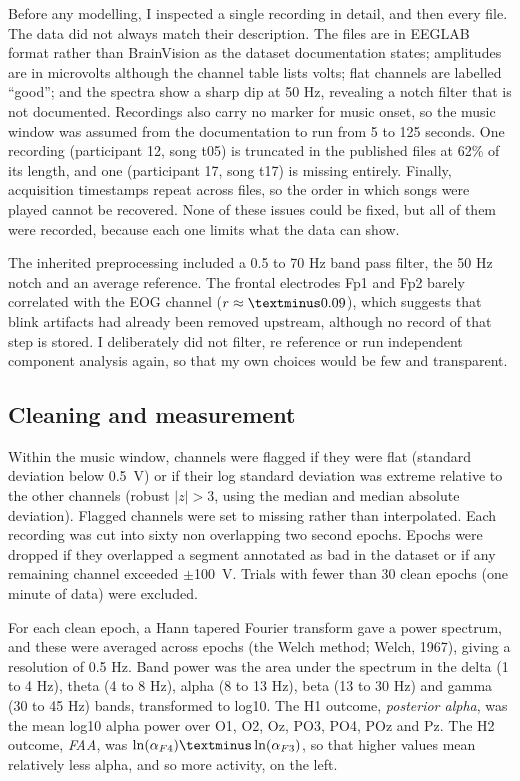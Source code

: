 \documentclass[11pt,a4paper]{article}
\newcommand{\m}{\textminus}
\newcommand{\uV}{\textmu V}
\begin{document}
Before any modelling, I inspected a single recording in detail, and then every file. The data did not always match their description. The files are in EEGLAB format rather than BrainVision as the dataset documentation states; amplitudes are in microvolts although the channel table lists volts; flat channels are labelled ``good''; and the spectra show a sharp dip at 50 Hz, revealing a notch filter that is not documented. Recordings also carry no marker for music onset, so the music window was assumed from the documentation to run from 5 to 125 seconds. One recording (participant 12, song t05) is truncated in the published files at 62\% of its length, and one (participant 17, song t17) is missing entirely. Finally, acquisition timestamps repeat across files, so the order in which songs were played cannot be recovered. None of these issues could be fixed, but all of them were recorded, because each one limits what the data can show.

The inherited preprocessing included a 0.5 to 70 Hz band pass filter, the 50 Hz notch and an average reference. The frontal electrodes Fp1 and Fp2 barely correlated with the EOG channel ($r \approx \m0.09$), which suggests that blink artifacts had already been removed upstream, although no record of that step is stored. I deliberately did not filter, re reference or run independent component analysis again, so that my own choices would be few and transparent.

\subsection{Cleaning and measurement}

Within the music window, channels were flagged if they were flat (standard deviation below 0.5~\uV) or if their log standard deviation was extreme relative to the other channels (robust $|z| > 3$, using the median and median absolute deviation). Flagged channels were set to missing rather than interpolated. Each recording was cut into sixty non overlapping two second epochs. Epochs were dropped if they overlapped a segment annotated as bad in the dataset or if any remaining channel exceeded $\pm$100~\uV. Trials with fewer than 30 clean epochs (one minute of data) were excluded.

For each clean epoch, a Hann tapered Fourier transform gave a power spectrum, and these were averaged across epochs (the Welch method; Welch, 1967), giving a resolution of 0.5 Hz. Band power was the area under the spectrum in the delta (1 to 4 Hz), theta (4 to 8 Hz), alpha (8 to 13 Hz), beta (13 to 30 Hz) and gamma (30 to 45 Hz) bands, transformed to log10. The H1 outcome, \emph{posterior alpha}, was the mean log10 alpha power over O1, O2, Oz, PO3, PO4, POz and Pz. The H2 outcome, \emph{FAA}, was $\ln(\alpha_{F4}) \m \ln(\alpha_{F3})$, so that higher values mean relatively less alpha, and so more activity, on the left.
\end{document}
